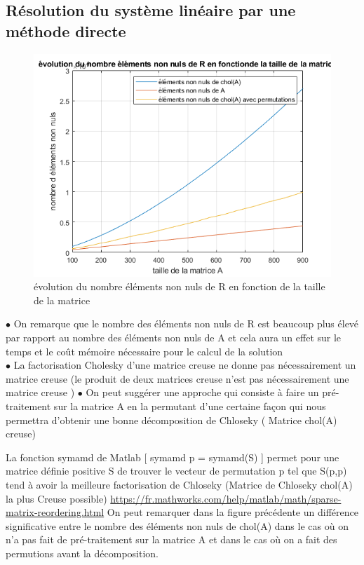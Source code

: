 \documentclass{article}
\begin{document}
\subsection{Résolution du système linéaire par une méthode directe}
\begin{figure}[H]
\centering
\includegraphics[width=12cm]{nonzero2.png}
\caption{évolution du nombre éléments non nuls de R en fonction de la taille de la matrice}
\end{figure}
$\bullet$ On remarque que le nombre des éléments non nuls de R est beaucoup plus élevé 
par rapport au nombre des éléments non nuls de A et cela aura un effet sur le temps et le coût mémoire nécessaire pour le calcul de la solution \\
$\bullet$ La factorisation Cholesky d'une matrice creuse ne donne pas nécessairement un matrice creuse (le produit de deux matrices creuse n'est pas nécessairement une matrice creuse )
\newline
$\bullet$ On peut suggérer une approche qui consiste à faire un pré-traitement sur la matrice A en la permutant d'une certaine façon qui nous permettra d'obtenir une bonne décomposition de Chloseky ( Matrice chol(A) creuse) 

\newline
La fonction symamd de Matlab [ symamd  p = symamd(S) ] permet pour une matrice définie positive S de trouver le vecteur de permutation p tel que S(p,p) tend à avoir la meilleure factorisation de Chloseky (Matrice de Chloseky chol(A) la plus Creuse possible) 
\newline
\newline
 \href{https://fr.mathworks.com/help/matlab/math/sparse-matrix-reordering.html}{https://fr.mathworks.com/help/matlab/math/sparse-matrix-reordering.html}
\newline
\newline 
On peut remarquer dans la figure précédente un différence significative entre le nombre des éléments non nuls de chol(A) dans le cas où on n'a pas fait de pré-traitement sur la matrice A et dans le cas où on a fait des permutions avant la décomposition.
 
\end{document}
